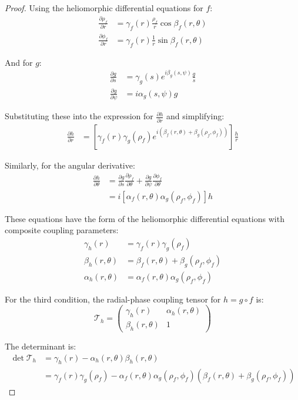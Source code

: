\begin{proof}
Using the heliomorphic differential equations for $f$:
\begin{align}
\frac{\partial \rho_f}{\partial r} &= \gamma_f(r)\frac{\rho_f}{r}\cos\beta_f(r,\theta)\\
\frac{\partial \phi_f}{\partial r} &= \gamma_f(r)\frac{1}{r}\sin\beta_f(r,\theta)
\end{align}

And for $g$:
\begin{align}
\frac{\partial g}{\partial s} &= \gamma_g(s)e^{i\beta_g(s,\psi)}\frac{g}{s}\\
\frac{\partial g}{\partial \psi} &= i\alpha_g(s,\psi)g
\end{align}

Substituting these into the expression for $\frac{\partial h}{\partial r}$ and simplifying:
\begin{align}
\frac{\partial h}{\partial r} &= \left[\gamma_f(r)\gamma_g(\rho_f)e^{i(\beta_f(r,\theta) + \beta_g(\rho_f,\phi_f))}\right]\frac{h}{r}
\end{align}

Similarly, for the angular derivative:
\begin{align}
\frac{\partial h}{\partial \theta} &= \frac{\partial g}{\partial s}\frac{\partial \rho_f}{\partial \theta} + \frac{\partial g}{\partial \psi}\frac{\partial \phi_f}{\partial \theta}\\
&= i\left[\alpha_f(r,\theta)\alpha_g(\rho_f,\phi_f)\right]h
\end{align}

These equations have the form of the heliomorphic differential equations with composite coupling parameters:
\begin{align}
\gamma_h(r) &= \gamma_f(r)\gamma_g(\rho_f)\\
\beta_h(r,\theta) &= \beta_f(r,\theta) + \beta_g(\rho_f,\phi_f)\\
\alpha_h(r,\theta) &= \alpha_f(r,\theta)\alpha_g(\rho_f,\phi_f)
\end{align}

For the third condition, the radial-phase coupling tensor for $h = g \circ f$ is:
\begin{equation}
\mathcal{T}_h = \begin{pmatrix}
\gamma_h(r) & \alpha_h(r,\theta)\\
\beta_h(r,\theta) & 1
\end{pmatrix}
\end{equation}

The determinant is:
\begin{align}
\det\mathcal{T}_h &= \gamma_h(r) - \alpha_h(r,\theta)\beta_h(r,\theta)\\
&= \gamma_f(r)\gamma_g(\rho_f) - \alpha_f(r,\theta)\alpha_g(\rho_f,\phi_f)(\beta_f(r,\theta) + \beta_g(\rho_f,\phi_f))
\end{align}


\end{proof}

